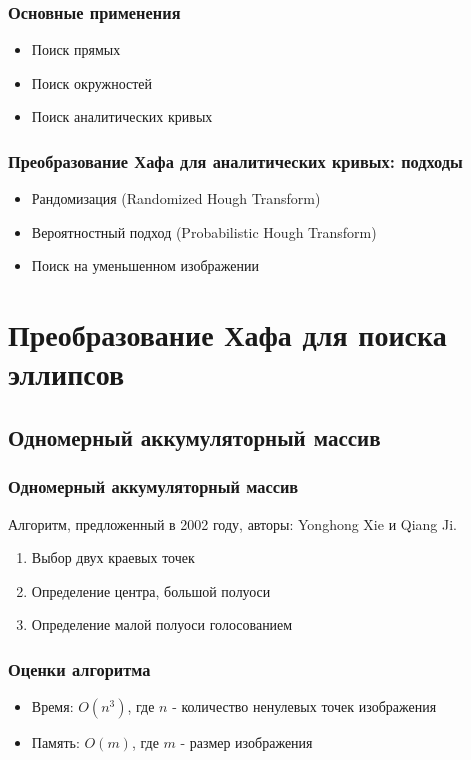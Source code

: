 \documentclass[14pt]{beamer}
\begin{document}

\begin{frame}
\frametitle{Основные применения}
\begin{itemize}
  \item Поиск прямых
  \item Поиск окружностей
  \item Поиск аналитических кривых
\end{itemize}
\end{frame}


\begin{frame}
\frametitle{Преобразование Хафа для аналитических кривых: подходы}
\begin{itemize}
  \item Рандомизация (Randomized Hough Transform)
  \item Вероятностный подход (Probabilistic Hough Transform)
  \item Поиск на уменьшенном изображении
\end{itemize}
\end{frame}

\section{Преобразование Хафа для поиска эллипсов}

\subsection{Одномерный аккумуляторный массив}
\begin{frame}
\frametitle{Одномерный аккумуляторный массив}
Алгоритм, предложенный в 2002 году, авторы: Yonghong Xie и Qiang Ji.
\begin{enumerate}
  \item Выбор двух краевых точек
  \item Определение центра, большой полуоси
  \item Определение малой полуоси голосованием
\end{enumerate}
\end{frame}

\begin{frame}
\frametitle{Оценки алгоритма}
\begin{itemize}
  \item Время: \(O(n^3)\), где \(n\) - количество ненулевых точек изображения
  \item Память: \(O(m)\), где \(m\) - размер изображения
\end{itemize}
\end{frame}
\end{document}
